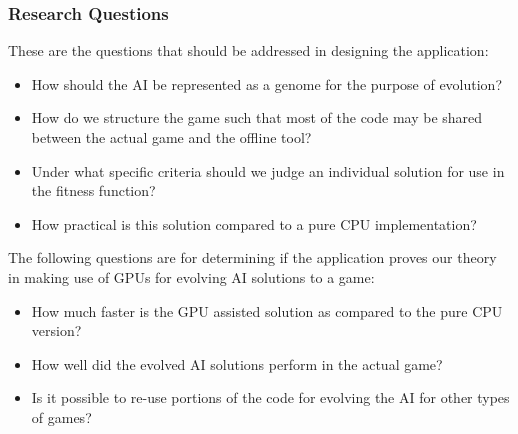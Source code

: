 \subsubsection*{Research Questions}
These are the questions that should be addressed in designing the application:

\begin{itemize}
 \item How should the AI be represented as a genome for the purpose of evolution?

 \item How do we structure the game such that most of the code may be shared between
the actual game and the offline tool?

 \item Under what specific criteria should we judge an individual solution for use in the
fitness function?

 \item How practical is this solution compared to a pure CPU implementation?
\end{itemize}


The following questions are for determining if the application proves our theory
in making use of GPUs for evolving AI solutions to a game:

\begin{itemize}
 \item How much faster is the GPU assisted solution as compared to the pure CPU
 version?
 
 \item How well did the evolved AI solutions perform in the actual game?
 
 \item Is it possible to re-use portions of the code for evolving the AI for other
 types of games?
\end{itemize}